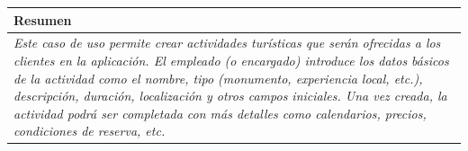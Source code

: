         \begin{table}[H]
            \begin{tabular}{llllllll}
        \hline
        \multicolumn{8}{|l|}{\cellcolor[HTML]{F2F2F2}Resumen}                                                                                                                                                                                                                                                                                                                                                                                             \\ \hline
        \multicolumn{8}{|p{15cm}|}{{\color[HTML]{808080} \textit{Este caso de uso permite crear actividades turísticas que serán ofrecidas a los clientes en la aplicación. El empleado (o encargado) introduce los datos básicos de la actividad como el nombre, tipo (monumento, experiencia local, etc.), descripción, duración, localización y otros campos iniciales. Una vez creada, la actividad podrá ser completada con más detalles como calendarios, precios, condiciones de reserva, etc.}}} \\ \hline
        \end{tabular}
        \end{table}

